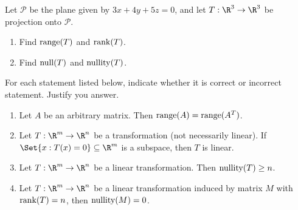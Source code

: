 \begin{exercises}
\begin{problist}
		\prob Let $\mathcal P$ be the plane given by $3x+4y+5z=0$, and let $T:\R^3\to\R^3$ be projection onto $\mathcal P$. 
		\begin{enumerate}
		    \item Find $\operatorname{range}(T)$ and $\operatorname{rank}(T)$.
		    \item Find $\operatorname{null}(T)$ and $\operatorname{nullity}(T)$.
		\end{enumerate}
		\prob For each statement listed below, indicate whether it is correct or incorrect statement. Justify you answer.
		\begin{enumerate}
		    \item Let $A$ be an arbitrary matrix. Then $\operatorname{range}(A)=\operatorname{range}(A^T)$.
		    \item Let $T:\R^m\to\R^n$ be a transformation (not necessarily linear). If $\Set{x:T(x)=0} \subseteq \R^m$ is a subspace, then $T$ is linear.
		    \item Let $T:\R^m\to\R^n$ be a linear transformation. Then $\operatorname{nullity}(T) \geq n$.
		    \item Let $T:\R^m\to\R^n$ be a linear transformation induced by matrix $M$ with $\operatorname{rank}(T) = n$, then $\operatorname{nullity}(M) = 0$.
		\end{enumerate}

	\end{problist}
\end{exercises}
